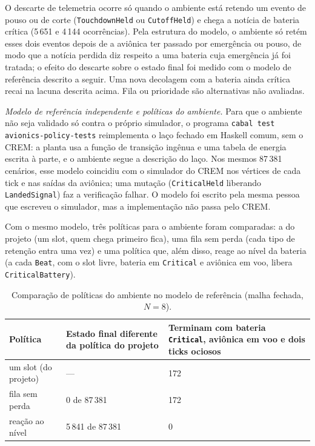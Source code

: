 \documentclass[12pt,a4paper]{article}
\begin{document}
O descarte de telemetria ocorre só quando o ambiente está retendo um evento de pouso ou de corte (\texttt{TouchdownHeld} ou \texttt{CutoffHeld}) e chega a notícia de bateria crítica (5\,651 e 4\,144 ocorrências). Pela estrutura do modelo, o ambiente só retém esses dois eventos depois de a aviônica ter passado por emergência ou pouso, de modo que a notícia perdida diz respeito a uma bateria cuja emergência já foi tratada; o efeito do descarte sobre o estado final foi medido com o modelo de referência descrito a seguir. Uma nova decolagem com a bateria ainda crítica recai na lacuna descrita acima. Fila ou prioridade são alternativas não avaliadas.

\textit{Modelo de referência independente e políticas do ambiente.} Para que o ambiente não seja validado só contra o próprio simulador, o programa \texttt{cabal test avionics-policy-tests} reimplementa o laço fechado em Haskell comum, sem o CREM: a planta usa a função de transição ingênua e uma tabela de energia escrita à parte, e o ambiente segue a descrição do laço. Nos mesmos 87\,381 cenários, esse modelo coincidiu com o simulador do CREM nos vértices de cada tick e nas saídas da aviônica; uma mutação (\texttt{CriticalHeld} liberando \texttt{LandedSignal}) faz a verificação falhar. O modelo foi escrito pela mesma pessoa que escreveu o simulador, mas a implementação não passa pelo CREM.

Com o mesmo modelo, três políticas para o ambiente foram comparadas: a do projeto (um slot, quem chega primeiro fica), uma fila sem perda (cada tipo de retenção entra uma vez) e uma política que, além disso, reage ao nível da bateria (a cada \texttt{Beat}, com o slot livre, bateria em \texttt{Critical} e aviônica em voo, libera \texttt{CriticalBattery}).

\begin{table}[h]
\centering
\footnotesize
\begin{tabular}{|p{5.2cm}|p{4.6cm}|p{4.6cm}|}
\hline
Política & Estado final diferente da política do projeto & Terminam com bateria \texttt{Critical}, aviônica em voo e dois ticks ociosos \\
\hline
um slot (do projeto) & --- & 172 \\
\hline
fila sem perda & 0 de 87\,381 & 172 \\
\hline
reação ao nível & 5\,841 de 87\,381 & 0 \\
\hline
\end{tabular}
\caption{Comparação de políticas do ambiente no modelo de referência (malha fechada, $N = 8$).}
\end{table}
\end{document}
